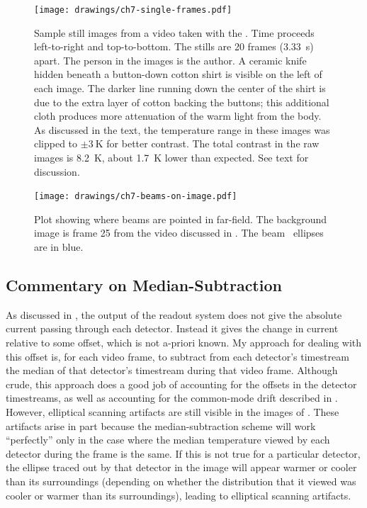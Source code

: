 \begin{figure}
\centering
\texttt{[image: drawings/ch7-single-frames.pdf]}
\caption[Sample still images from a video taken with the \Imager]{
Sample still images from a video taken with the \Imager.
Time proceeds left-to-right and top-to-bottom.
The stills are 20 frames (\SI{3.33}{\s}) apart.
The person in the images is the author.
A ceramic knife hidden beneath a button-down cotton shirt is visible on the left of each image.
The darker line running down the center of the shirt is due to the extra layer of cotton backing the buttons; this additional cloth produces more attenuation of the warm light from the body.
As discussed in the text, the temperature range in these images was clipped to $\pm \SI{3}{\K}$ for better contrast.
The total contrast in the raw images is \SI{8.2}{\K}, about \SI{1.7}{\K} lower than expected.
See text for discussion.
}
\label{fig:ch7-single-frames}
\end{figure}

\begin{figure}
\centering
\texttt{[image: drawings/ch7-beams-on-image.pdf]}
\caption[Plot showing where beams are pointed in far-field]{
  Plot showing where beams are pointed in far-field.
  The background image is frame 25 from the video discussed in .
  The beam \FWHM\ ellipses are in blue.
}
\label{fig:ch7-beams-on-image}
\end{figure}

\subsection{Commentary on Median-Subtraction}

As discussed in , the output of the readout system does not give the absolute current passing through each detector.
Instead it gives the change in current relative to some offset, which is not a-priori known.
My approach for dealing with this offset is, for each video frame, to subtract from each detector's timestream the median of that detector's timestream during that video frame.
Although crude, this approach does a good job of accounting for the offsets in the detector timestreams, as well as accounting for the common-mode drift described in .
However, elliptical scanning artifacts are still visible in the images of .
These artifacts arise in part because the median-subtraction scheme will work ``perfectly'' only in the case where the median temperature viewed by each detector during the frame is the same.
If this is not true for a particular detector, the ellipse traced out by that detector in the image will appear warmer or cooler than its surroundings (depending on whether the distribution that it viewed was cooler or warmer than its surroundings), leading to elliptical scanning artifacts.

